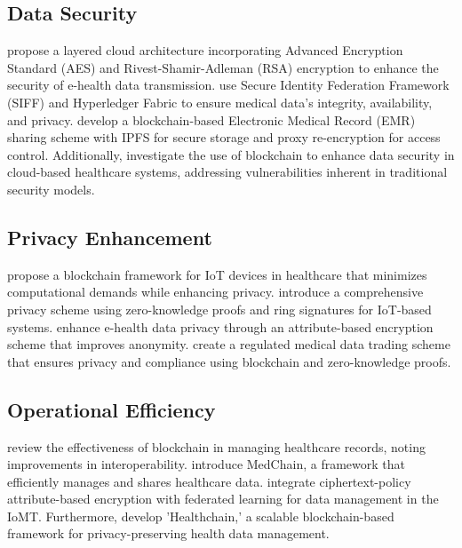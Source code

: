 \documentclass[cic,tc,english]{iiufrgs}
\begin{document}


        
        \subsection{Data Security} \citet{Memos2021} propose a layered cloud architecture incorporating Advanced Encryption Standard (AES) and Rivest-Shamir-Adleman (RSA) encryption to enhance the security of e-health data transmission. \citet{Tian2019} use Secure Identity Federation Framework (SIFF) and Hyperledger Fabric to ensure medical data's integrity, availability, and privacy. \citet{Liu2024} develop a blockchain-based Electronic Medical Record (EMR) sharing scheme with IPFS for secure storage and proxy re-encryption for access control. Additionally, \citet{Esposito2018} investigate the use of blockchain to enhance data security in cloud-based healthcare systems, addressing vulnerabilities inherent in traditional security models.
        
        \subsection{Privacy Enhancement} \citet{Dwivedi2019} propose a blockchain framework for IoT devices in healthcare that minimizes computational demands while enhancing privacy. \citet{Esfahani2024} introduce a comprehensive privacy scheme using zero-knowledge proofs and ring signatures for IoT-based systems. \citet{Zala2024} enhance e-health data privacy through an attribute-based encryption scheme that improves anonymity. \citet{Li2024} create a regulated medical data trading scheme that ensures privacy and compliance using blockchain and zero-knowledge proofs.
        
        \subsection{Operational Efficiency} \citet{Vazirani2019} review the effectiveness of blockchain in managing healthcare records, noting improvements in interoperability. \citet{Shen2019} introduce MedChain, a framework that efficiently manages and shares healthcare data. \citet{Bhansali2022} integrate ciphertext-policy attribute-based encryption with federated learning for data management in the IoMT. Furthermore, \citet{XuJie2019} develop 'Healthchain,' a scalable blockchain-based framework for privacy-preserving health data management.
        
\end{document}
